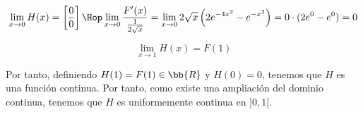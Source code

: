 \documentclass[12pt]{article}
\begin{document}
\begin{ejercicio}
\begin{enumerate}
    \begin{equation*}
        \lim_{x\to 0}H(x)=\left[\frac{0}{0}\right]\Hop
        \lim_{x\to 0}\frac{F'(x)}{\frac{1}{2\sqrt{x}}}
        = \lim_{x\to 0}2\sqrt{x}\left(2e^{-4x^2}-e^{-x^2}\right)
        = 0\cdot (2e^0-e^0)=0
    \end{equation*}

    \begin{equation*}
        \lim_{x\to 1}H(x)=F(1)
    \end{equation*}

    Por tanto, definiendo $H(1)=F(1)\in \bb{R}$ y $H(0)=0$, tenemos que $H$ es una función continua. Por tanto, como existe una ampliación del dominio continua, tenemos que $H$ es uniformemente continua en $]0,1[$.
\end{enumerate}
    
\end{ejercicio}
\end{document}
